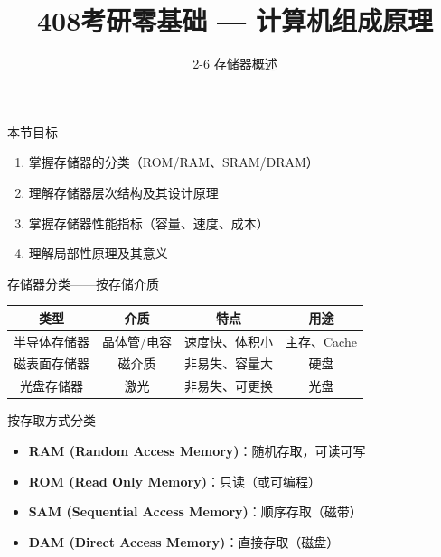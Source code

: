 \documentclass[10pt, aspectratio=169]{beamer}
\title{408考研零基础 --- 计算机组成原理}
\subtitle{2-6 存储器概述}
\author{}
\date{}
\begin{document}
\begin{frame}{本节目标}
    \begin{enumerate}
        \item 掌握存储器的分类（ROM/RAM、SRAM/DRAM）
        \item 理解存储器层次结构及其设计原理
        \item 掌握存储器性能指标（容量、速度、成本）
        \item 理解局部性原理及其意义
    \end{enumerate}
\end{frame}

\begin{frame}{存储器分类——按存储介质}
    \begin{center}
        \begin{tabular}{|c|c|c|c|}
            \hline
            \textbf{类型} & \textbf{介质} & \textbf{特点} & \textbf{用途} \\
            \hline
            半导体存储器 & 晶体管/电容 & 速度快、体积小 & 主存、Cache \\
            \hline
            磁表面存储器 & 磁介质 & 非易失、容量大 & 硬盘 \\
            \hline
            光盘存储器 & 激光 & 非易失、可更换 & 光盘 \\
            \hline
        \end{tabular}
    \end{center}
    \vspace{0.5em}
    \begin{block}{按存取方式分类}
        \begin{itemize}
            \item \textbf{RAM (Random Access Memory)}：随机存取，可读可写
            \item \textbf{ROM (Read Only Memory)}：只读（或可编程）
            \item \textbf{SAM (Sequential Access Memory)}：顺序存取（磁带）
            \item \textbf{DAM (Direct Access Memory)}：直接存取（磁盘）
        \end{itemize}
    \end{block}
\end{frame}
\end{document}
